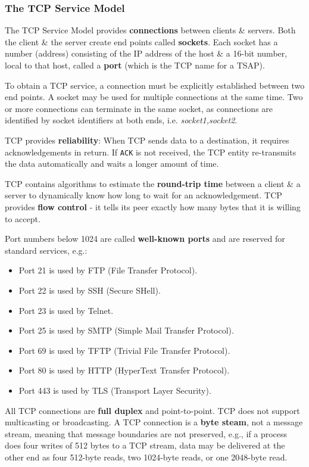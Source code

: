 \documentclass[11pt]{article}
\begin{document}
\subsubsection{The TCP Service Model}
The TCP Service Model provides \textbf{connections} between clients \& servers. 
Both the client \& the server create end points called \textbf{sockets}.
Each socket has a number (address) consisting of the IP address of the host \& a 16-bit number, local to that host, called a \textbf{port} (which is the TCP name for a TSAP).

To obtain a TCP service, a connection must be explicitly established between two end points.
A socket may be used for multiple connections at the same time.
Two or more connections can terminate in the same socket, as connections are identified by socket identifiers at both ends, i.e. \textit{socket1,socket2}.

TCP provides \textbf{reliability}: When TCP sends data to a destination, it requires acknowledgements in return. 
If \verb|ACK| is not received, the TCP entity re-transmits the data automatically and waits a longer amount of time.

TCP contains algorithms to estimate the \textbf{round-trip time} between a client \& a server to dynamically know how long to wait for an acknowledgement.
TCP provides \textbf{flow control} - it tells its peer exactly how many bytes that it is willing to accept.

Port numbers below 1024 are called \textbf{well-known ports} and are reserved for standard services, e.g.:
\begin{itemize}
    \item   Port 21 is used by FTP (File Transfer Protocol). 
    \item   Port 22 is used by SSH (Secure SHell).
    \item   Port 23 is used by Telnet.
    \item   Port 25 is used by SMTP (Simple Mail Transfer Protocol).
    \item   Port 69 is used by TFTP (Trivial File Transfer Protocol).
    \item   Port 80 is used by HTTP (HyperText Transfer Protocol).
    \item   Port 443 is used by TLS (Transport Layer Security).
\end{itemize}

All TCP connections are \textbf{full duplex} and point-to-point. 
TCP does not support multicasting or broadcasting.
A TCP connection is a \textbf{byte steam}, not a message stream, meaning that message boundaries are not preserved, e.g., if a process does four writes of 512 bytes to a TCP stream, data may be delivered 
at the other end as four 512-byte reads, two 1024-byte reads, or one 2048-byte read.
\end{document}
